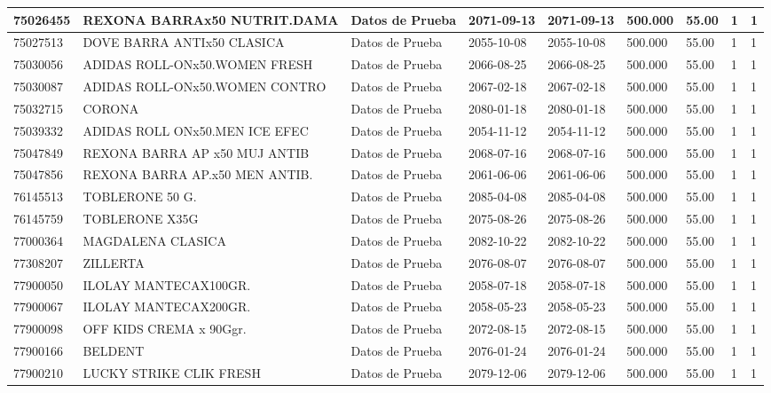 \documentclass[a4paper,12pt]{article}
\begin{document}
\begin{landscape}
\begin{longtable}{|p{4cm}|p{2.5cm}|p{2.5cm}|p{1.8cm}|p{1.8cm}|p{1cm}|p{1cm}|p{3cm}|p{3cm}||}
75026455 & REXONA BARRAx50 NUTRIT.DAMA & Datos de Prueba & 2071-09-13 & 2071-09-13 & 500.000 & 55.00 & 1 & 1 \\ \hline 
75027513 & DOVE BARRA ANTIx50 CLASICA & Datos de Prueba & 2055-10-08 & 2055-10-08 & 500.000 & 55.00 & 1 & 1 \\ \hline 
75030056 & ADIDAS ROLL-ONx50.WOMEN FRESH & Datos de Prueba & 2066-08-25 & 2066-08-25 & 500.000 & 55.00 & 1 & 1 \\ \hline 
75030087 & ADIDAS ROLL-ONx50.WOMEN CONTRO & Datos de Prueba & 2067-02-18 & 2067-02-18 & 500.000 & 55.00 & 1 & 1 \\ \hline 
75032715 & CORONA & Datos de Prueba & 2080-01-18 & 2080-01-18 & 500.000 & 55.00 & 1 & 1 \\ \hline 
75039332 & ADIDAS ROLL ONx50.MEN ICE EFEC & Datos de Prueba & 2054-11-12 & 2054-11-12 & 500.000 & 55.00 & 1 & 1 \\ \hline 
75047849 & REXONA BARRA AP x50 MUJ ANTIB & Datos de Prueba & 2068-07-16 & 2068-07-16 & 500.000 & 55.00 & 1 & 1 \\ \hline 
75047856 & REXONA BARRA AP.x50 MEN ANTIB. & Datos de Prueba & 2061-06-06 & 2061-06-06 & 500.000 & 55.00 & 1 & 1 \\ \hline 
76145513 & TOBLERONE   50 G. & Datos de Prueba & 2085-04-08 & 2085-04-08 & 500.000 & 55.00 & 1 & 1 \\ \hline 
76145759 & TOBLERONE X35G & Datos de Prueba & 2075-08-26 & 2075-08-26 & 500.000 & 55.00 & 1 & 1 \\ \hline 
77000364 & MAGDALENA CLASICA & Datos de Prueba & 2082-10-22 & 2082-10-22 & 500.000 & 55.00 & 1 & 1 \\ \hline 
77308207 & ZILLERTA & Datos de Prueba & 2076-08-07 & 2076-08-07 & 500.000 & 55.00 & 1 & 1 \\ \hline 
77900050 & ILOLAY MANTECAX100GR. & Datos de Prueba & 2058-07-18 & 2058-07-18 & 500.000 & 55.00 & 1 & 1 \\ \hline 
77900067 & ILOLAY MANTECAX200GR. & Datos de Prueba & 2058-05-23 & 2058-05-23 & 500.000 & 55.00 & 1 & 1 \\ \hline 
77900098 & OFF KIDS CREMA x 90Ggr. & Datos de Prueba & 2072-08-15 & 2072-08-15 & 500.000 & 55.00 & 1 & 1 \\ \hline 
77900166 & BELDENT & Datos de Prueba & 2076-01-24 & 2076-01-24 & 500.000 & 55.00 & 1 & 1 \\ \hline 
77900210 & LUCKY STRIKE CLIK FRESH & Datos de Prueba & 2079-12-06 & 2079-12-06 & 500.000 & 55.00 & 1 & 1 \\ \hline 

\end{longtable}
\end{landscape}
\end{document}
